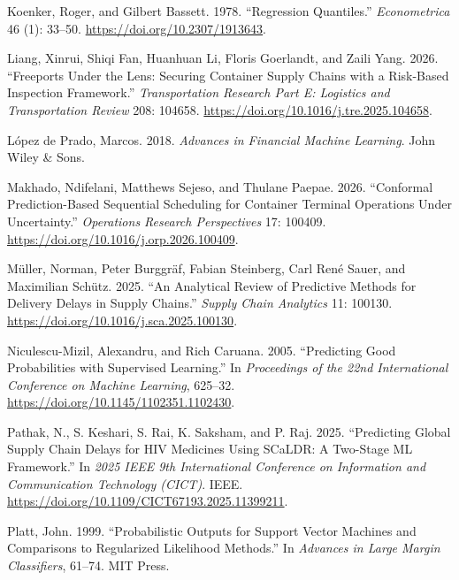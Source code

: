 \documentclass[
]{article}
\newlength{\cslhangindent}
\newenvironment{CSLReferences}[2] %
 {\begin{list}{}{%
  \setlength{\itemindent}{0pt}
  \setlength{\leftmargin}{0pt}
  \setlength{\parsep}{0pt}
  \ifodd #1
   \setlength{\leftmargin}{\cslhangindent}
   \setlength{\itemindent}{-1\cslhangindent}
  \fi
  \setlength{\itemsep}{#2\baselineskip}}}
 {\end{list}}
\begin{document}
\begin{CSLReferences}{1}{0}
Koenker, Roger, and Gilbert Bassett. 1978. {``Regression Quantiles.''}
\emph{Econometrica} 46 (1): 33--50.
\url{https://doi.org/10.2307/1913643}.

Liang, Xinrui, Shiqi Fan, Huanhuan Li, Floris Goerlandt, and Zaili Yang.
2026. {``Freeports Under the Lens: Securing Container Supply Chains with
a Risk-Based Inspection Framework.''} \emph{Transportation Research Part
E: Logistics and Transportation Review} 208: 104658.
\url{https://doi.org/10.1016/j.tre.2025.104658}.

López de Prado, Marcos. 2018. \emph{Advances in Financial Machine
Learning}. John Wiley \& Sons.

Makhado, Ndifelani, Matthews Sejeso, and Thulane Paepae. 2026.
{``Conformal Prediction-Based Sequential Scheduling for Container
Terminal Operations Under Uncertainty.''} \emph{Operations Research
Perspectives} 17: 100409.
\url{https://doi.org/10.1016/j.orp.2026.100409}.

Müller, Norman, Peter Burggräf, Fabian Steinberg, Carl René Sauer, and
Maximilian Schütz. 2025. {``An Analytical Review of Predictive Methods
for Delivery Delays in Supply Chains.''} \emph{Supply Chain Analytics}
11: 100130. \url{https://doi.org/10.1016/j.sca.2025.100130}.

Niculescu-Mizil, Alexandru, and Rich Caruana. 2005. {``Predicting Good
Probabilities with Supervised Learning.''} In \emph{Proceedings of the
22nd International Conference on Machine Learning}, 625--32.
\url{https://doi.org/10.1145/1102351.1102430}.

Pathak, N., S. Keshari, S. Rai, K. Saksham, and P. Raj. 2025.
{``Predicting Global Supply Chain Delays for HIV Medicines Using SCaLDR:
A Two-Stage ML Framework.''} In \emph{2025 IEEE 9th International
Conference on Information and Communication Technology (CICT)}. IEEE.
\url{https://doi.org/10.1109/CICT67193.2025.11399211}.

Platt, John. 1999. {``Probabilistic Outputs for Support Vector Machines
and Comparisons to Regularized Likelihood Methods.''} In \emph{Advances
in Large Margin Classifiers}, 61--74. MIT Press.


\end{CSLReferences}
\end{document}
